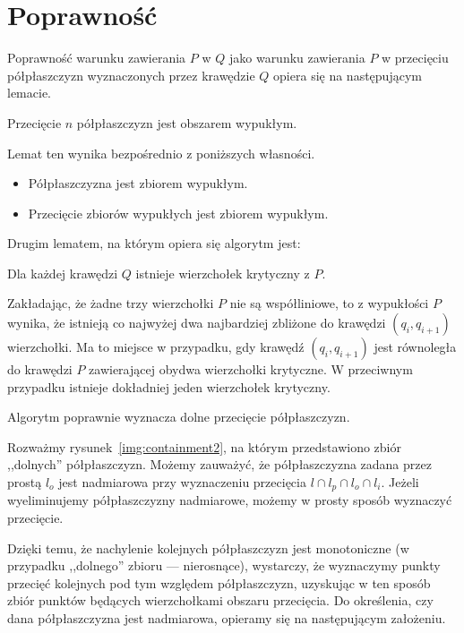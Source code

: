 \section{Poprawność}
Poprawność warunku zawierania $P$ w $Q$ jako warunku zawierania $P$ w
przecięciu półpłaszczyzn wyznaczonych przez krawędzie $Q$ opiera się
na następującym lemacie.

\begin{lemat}\emph{\cite{Chazelle83}}
  Przecięcie $n$ półpłaszczyzn jest obszarem wypukłym.
\end{lemat}

Lemat ten wynika bezpośrednio z poniższych własności.

\begin{itemize}
  \item Półpłaszczyzna jest zbiorem wypukłym.
  \item Przecięcie zbiorów wypukłych jest zbiorem wypukłym.
\end{itemize}

Drugim lematem, na którym opiera się algorytm jest:

\begin{lemat}\emph{\cite{Chazelle83}}
  Dla każdej krawędzi $Q$ istnieje wierzchołek krytyczny z $P$.
\end{lemat}

Zakładając, że żadne trzy wierzchołki $P$ nie są współliniowe, to z
wypukłości $P$ wynika, że istnieją co najwyżej dwa najbardziej
zbliżone do krawędzi $(q_i,q_{i+1})$ wierzchołki. Ma to miejsce w
przypadku, gdy krawędź $(q_i,q_{i+1})$ jest równoległa do krawędzi $P$
zawierającej obydwa wierzchołki krytyczne. W przeciwnym przypadku
istnieje dokładniej jeden wierzchołek krytyczny.

\begin{lemat}\emph{\cite{Chazelle83}}
  Algorytm poprawnie wyznacza dolne przecięcie półpłaszczyzn.
\end{lemat}

Rozważmy rysunek~\ref{img:containment2}, na którym przedstawiono zbiór
,,dolnych'' półpłaszczyzn. Możemy zauważyć, że półpłaszczyzna zadana
przez prostą $l_o$ jest nadmiarowa przy wyznaczeniu przecięcia $l \cap
l_p \cap l_o \cap l_i$. Jeżeli wyeliminujemy półpłaszczyzny
nadmiarowe, możemy w prosty sposób wyznaczyć przecięcie.

Dzięki temu, że nachylenie kolejnych półpłaszczyzn jest monotoniczne
(w przypadku ,,dolnego'' zbioru --- nierosnące), wystarczy, że
wyznaczymy punkty przecięć kolejnych pod tym względem półpłaszczyzn,
uzyskując w ten sposób zbiór punktów będących wierzchołkami obszaru
przecięcia. Do określenia, czy dana półpłaszczyzna jest nadmiarowa,
opieramy się na następującym założeniu.

